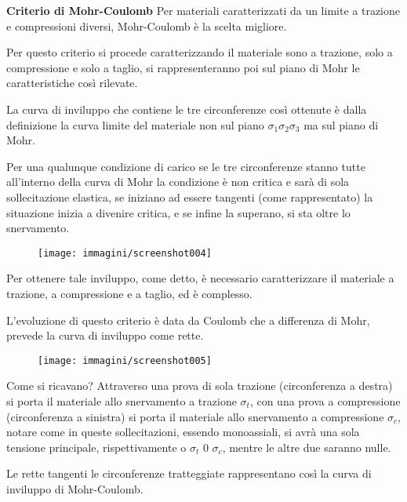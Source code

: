 \documentclass{article}
\begin{document}
\begin{adjustwidth}{2in}{}
 		\textbf{{\Large Criterio di Mohr-Coulomb }} \newline 
 		Per materiali caratterizzati da un limite a trazione e compressioni diversi, Mohr-Coulomb è la scelta migliore.
 		
 		Per questo criterio si procede caratterizzando il materiale sono a trazione, solo a compressione e solo a taglio, si rappresenteranno poi sul piano di Mohr le caratteristiche così rilevate. 
 		
 		La curva di inviluppo che contiene le tre circonferenze così ottenute è dalla definizione la curva limite del materiale non sul piano $\sigma_1\sigma_2\sigma_3$ ma sul piano di Mohr. 
 		
 		Per una qualunque condizione di carico se le tre circonferenze stanno tutte all'interno della curva di Mohr la condizione è non critica e sarà di sola sollecitazione elastica, se iniziano ad essere tangenti (come rappresentato) la situazione inizia a divenire critica, e se infine la superano, si sta oltre lo snervamento. 
 		
 		\begin{figure}[H]
 			\centering
 			\texttt{[image: immagini/screenshot004]}
 			\label{fig:screenshot004}
 		\end{figure}
 		
 		
 		Per ottenere tale inviluppo, come detto, è necessario caratterizzare il materiale a trazione, a compressione e a taglio, ed è complesso. \newline 
 		
 		L'evoluzione di questo criterio è data da Coulomb che a differenza di Mohr, prevede la curva di inviluppo come rette. 
 		
\begin{figure}[H]
	\centering
	\label{fig:screenshot005}
	\texttt{[image: immagini/screenshot005]}
\end{figure}
 				
 		Come si ricavano? Attraverso una prova di sola trazione (circonferenza a destra) si porta il materiale allo snervamento a trazione $\sigma_t$, con una prova a compressione (circonferenza a sinistra) si porta il materiale allo snervamento a compressione $\sigma_c$, notare come in queste sollecitazioni, essendo monoassiali, si avrà una sola tensione principale, rispettivamente o $\sigma_t$ 0 $\sigma_c$, mentre le altre due saranno nulle. \newline 
 		
 		Le rette tangenti le circonferenze tratteggiate rappresentano così la curva di inviluppo di Mohr-Coulomb. 
 		

\end{adjustwidth}
\end{document}
